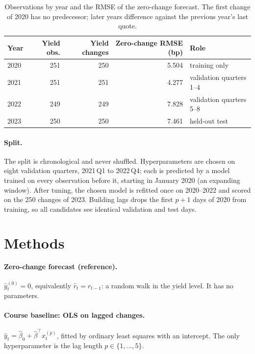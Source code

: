 \documentclass{article}
\begin{document}
\begin{table}[t]
  \caption{Observations by year and the RMSE of the zero-change forecast. The first change of 2020 has no predecessor; later years difference against the previous year's last quote.}
  \label{tab:data}
  \centering
  \begin{tabular}{lrrrl}
    \toprule
    Year & Yield obs. & Yield changes & Zero-change RMSE (bp) & Role\\
    \midrule
    2020 & 251 & 250 & 5.504 & training only\\
    2021 & 251 & 251 & 4.277 & validation quarters 1--4\\
    2022 & 249 & 249 & 7.828 & validation quarters 5--8\\
    2023 & 250 & 250 & 7.461 & held-out test\\
    \bottomrule
  \end{tabular}
\end{table}

\paragraph{Split.} The split is chronological and never shuffled. Hyperparameters are chosen on eight validation quarters, 2021\,Q1 to 2022\,Q4; each is predicted by a model trained on every observation before it, starting in January 2020 (an expanding window). After tuning, the chosen model is refitted once on 2020--2022 and scored on the 250 changes of 2023. Building lags drops the first $p+1$ days of 2020 from training, so all candidates see identical validation and test days.

\section{Methods}\label{sec:methods}
\paragraph{Zero-change forecast (reference).} $\widehat y_t^{(0)} = 0$, equivalently $\widehat r_t = r_{t-1}$: a random walk in the yield level. It has no parameters.

\paragraph{Course baseline: OLS on lagged changes.} $\widehat y_t = \widehat\beta_0 + \widehat\beta^\top x_t^{(p)}$, fitted by ordinary least squares with an intercept. The only hyperparameter is the lag length $p \in \{1,\dots,5\}$.
\end{document}
